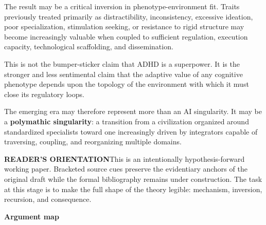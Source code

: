 \documentclass[10pt]{article}
\newcommand{\ActiveAccent}{Industrial}
\newcommand{\papersection}[2]{%
  \Needspace{8\baselineskip}
  \vspace{1.1em}
  \noindent\begin{minipage}[t]{0.12\textwidth}
    \vspace{1pt}{\sffamily\bfseries\fontsize{17}{17}\selectfont\textcolor{\ActiveAccent}{#1}}
  \end{minipage}%
  \begin{minipage}[t]{0.86\textwidth}
    {\sffamily\bfseries\fontsize{16.2}{19}\selectfont #2}\par
    \vspace{0.35em}{\color{\ActiveAccent}\rule{\linewidth}{1.15pt}}
  \end{minipage}
  \vspace{0.55em}
}
\newcommand{\term}[1]{\textsf{\bfseries\textcolor{\ActiveAccent}{#1}}}
\begin{document}
The result may be a critical inversion in phenotype-environment fit. Traits previously treated primarily as distractibility, inconsistency, excessive ideation, poor specialization, stimulation seeking, or resistance to rigid structure may become increasingly valuable when coupled to sufficient regulation, execution capacity, technological scaffolding, and dissemination.

This is not the bumper-sticker claim that ADHD is a superpower. It is the stronger and less sentimental claim that the adaptive value of any cognitive phenotype depends upon the topology of the environment with which it must close its regulatory loops.

The emerging era may therefore represent more than an AI singularity. It may be a \term{polymathic singularity}: a transition from a civilization organized around standardized specialists toward one increasingly driven by integrators capable of traversing, coupling, and reorganizing multiple domains.

\vfill
\begin{minipage}{\linewidth}
\colorbox{PalePolymathic}{\begin{minipage}{0.94\linewidth}
\vspace{0.35em}\small
\textsf{\bfseries\textcolor{Polymathic}{READER'S ORIENTATION}}\quad This is an intentionally hypothesis-forward working paper. Bracketed source cues preserve the evidentiary anchors of the original draft while the formal bibliography remains under construction. The task at this stage is to make the full shape of the theory legible: mechanism, inversion, recursion, and consequence.
\vspace{0.35em}
\end{minipage}}
\end{minipage}

\clearpage
\papersection{}{Argument map}
\end{document}
